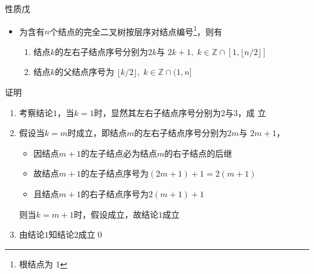 \begin{frame}
    \frametitle{\insertsubsectionhead}
    \begin{block}{性质戊}
        \begin{itemize}
            \item 为含有$n$个结点的完全二叉树按层序对结点编号\footnote{根结点为
                  $1$}，则有
                \begin{enumerate}
                    \item 结点$k$的左右子结点序号分别为$2k$与
                        $2k+1,\;k\in\mathbb{Z}\cap[1,\lfloor{}n/2\rfloor]$
                    \item 结点$k$的父结点序号为
                        $\lfloor{}k/2\rfloor,\;k\in\mathbb{Z}\cap(1,n]$
                \end{enumerate}
        \end{itemize}
    \end{block}
    \pause
    \begin{exampleblock}{证明}
        \begin{enumerate}
            \item 考察结论$1$，当$k=1$时，显然其左右子结点序号分别为$2$与$3$，成
                  立
            \item 假设当$k=m$时成立，即结点$m$的左右子结点序号分别为$2m$与
                  $2m+1$，
                  \begin{itemize}
                    \item 因结点$m+1$的左子结点必为结点$m$的右子结点的后继
                    \item 故结点$m+1$的左子结点序号为$(2m+1)+1=2(m+1)$
                    \item 且结点$m+1$的右子结点序号为$2(m+1)+1$
                  \end{itemize}
                  则当$k=m+1$时，假设成立，故结论$1$成立
            \item 由结论$1$知结论$2$成立\hfill\qed
        \end{enumerate}
    \end{exampleblock}
\end{frame}